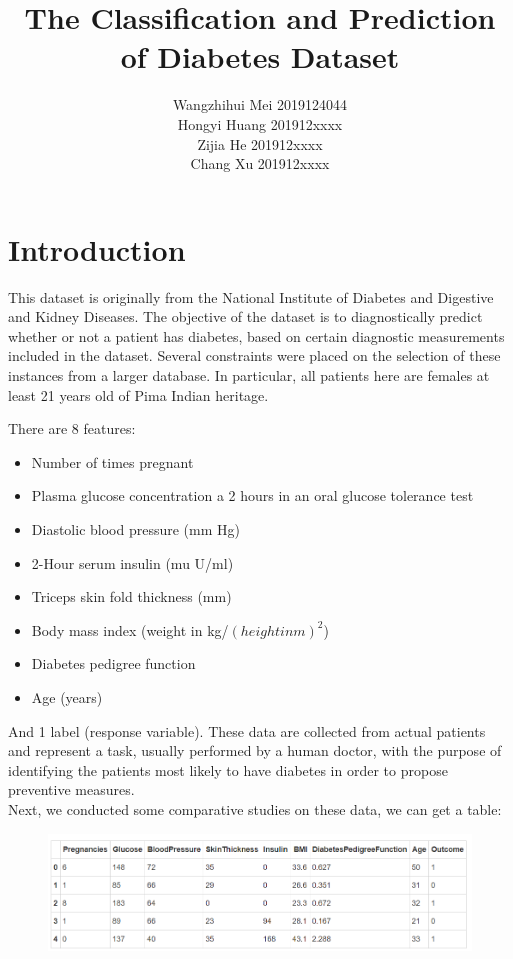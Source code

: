 \documentclass[11pt,en]{elegantpaper}
\title{The Classification and Prediction of Diabetes Dataset}
\author{Wangzhihui Mei 2019124044 \\ Hongyi Huang 201912xxxx \\ Zijia He 201912xxxx \\ Chang Xu 201912xxxx}
\institute{CCNU-UOW JI}
\begin{document}
\maketitle



\section{Introduction}
This dataset is originally from the National Institute of Diabetes and Digestive and Kidney Diseases. The objective of the dataset is to diagnostically predict whether or not a patient has diabetes, based on certain diagnostic measurements included in the dataset. Several constraints were placed on the selection of these instances from a larger database. In particular, all patients here are females at least 21 years old of Pima Indian heritage.

There are 8 features:\\
\begin{itemize}
    \item Number of times pregnant
    \item Plasma glucose concentration a 2 hours in an oral glucose tolerance test
    \item Diastolic blood pressure (mm Hg)
    \item 2-Hour serum insulin (mu U/ml)
    \item Triceps skin fold thickness (mm)
    \item Body mass index (weight in kg/$(height in m)^2$)
    \item Diabetes pedigree function
    \item Age (years)
\end{itemize}

And 1 label (response variable). These data are collected from actual patients and represent a task, 
usually performed by a human doctor, with the purpose of identifying the patients most likely to have
diabetes in order to propose preventive measures. \\
Next, we conducted some comparative studies on these data, we can get a table:\\
\begin{figure}[H]
    \centering
    \includegraphics[scale=0.6]{figure/1.PNG}  
\end{figure}
\end{document}
